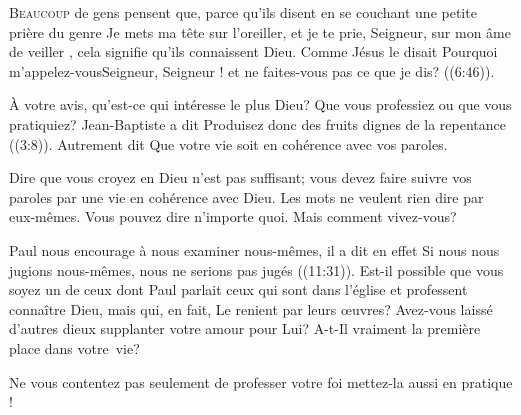 \lettrine{B}{eaucoup} de gens pensent que,
 parce qu'ils disent en se couchant une petite prière
 du genre\frcolon {}
 \Og Je mets ma tête sur l'oreiller, et je te prie, Seigneur,
 sur mon âme de veiller \Fg{}, cela signifie qu'ils connaissent Dieu.
 Comme Jésus le disait\frcolon {}
 \Og Pourquoi m'appelez-vous\frcolon Seigneur, Seigneur !
 et ne faites-vous pas ce que je dis? \Fg{} ((6:46)).

À votre avis, qu'est-ce qui intéresse le plus Dieu?
 Que vous professiez ou que vous pratiquiez?
 Jean-Baptiste a dit\frcolon {}
 \Og Produisez donc des fruits dignes de la repentance \Fg{}
 ((3:8)).
 Autrement dit\frcolon {}
 \Og Que votre vie soit en cohérence avec vos paroles. \Fg{}


Dire que vous croyez en Dieu n'est pas suffisant;
 vous devez faire suivre vos paroles par une vie en cohérence avec Dieu.
 Les mots ne veulent rien dire par eux-mêmes. Vous pouvez dire n'importe quoi.
 Mais  comment vivez-vous? 

Paul nous encourage à nous examiner nous-mêmes,
 il a dit en effet\frcolon {}
 \Og Si nous nous jugions nous-mêmes, nous ne serions pas jugés \Fg{}
 ((11:31)).
 Est-il possible que vous soyez un de ceux dont Paul parlait
 \ocadr ceux qui sont dans l'église et professent connaître Dieu, mais qui,
 en fait, Le renient par leurs \oe{}uvres? Avez-vous laissé d'autres dieux
 supplanter votre amour pour Lui?
 A-t-Il vraiment la première place dans votre~vie? 

Ne vous contentez pas seulement de professer votre foi
 \ocadr mettez-la 
 aussi en pratique ! 

\dvrule






